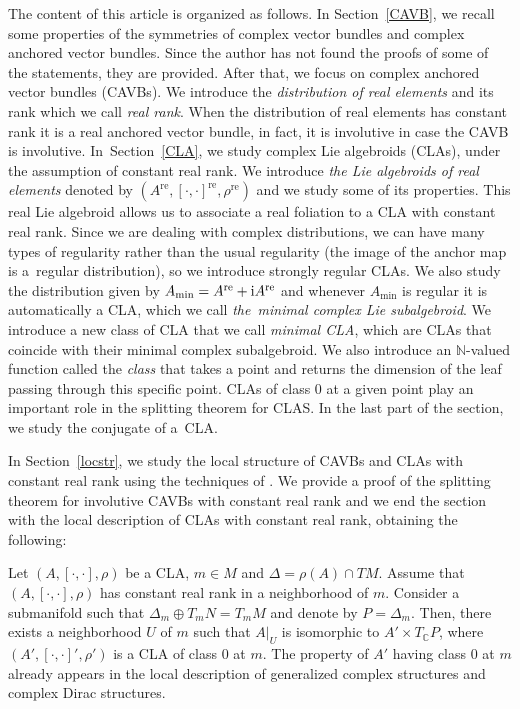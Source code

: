 \documentclass[pdftex]{sigma}
\numberwithin{equation}{section}
\newenvironment{customthm}[1]
{\renewcommand\theinnercustomthm{#1}\innercustomthm}
{\endinnercustomthm}
\newcommand{\C}{{\mathbb{C}}}
\DeclareMathOperator{\real}{re}
\begin{document}
The content of this article is organized as follows. In Section~\ref{CAVB}, we recall some properties of the symmetries of complex vector bundles and complex anchored vector bundles. Since the author has not found the proofs of some of the statements, they are provided. After that, we focus on complex anchored vector bundles (CAVBs). We introduce the {\em distribution of real elements} and its rank which we call {\em real rank}. When the distribution of real elements has constant rank it is a real anchored vector bundle, in fact, it is involutive in case the CAVB is involutive. In~Section~\ref{CLA}, we study complex Lie algebroids (CLAs), under the assumption of constant real rank. We introduce {\em the Lie algebroids of real elements} denoted by $(A^{\real},[\cdot,\cdot]^{\real},\rho^{\real})$ and we study some of its properties. This real Lie algebroid allows us to associate a real foliation to a CLA with constant real rank. Since we are dealing with complex distributions, we can have many types of regularity rather than the usual regularity (the image of the anchor map is a~regular distribution), so we introduce strongly regular CLAs. We also study the distribution given by $A_{\min}=A^{\real}+{\rm i}A^{\real}$ and whenever $A_{\min}$ is regular it is automatically a CLA, which we call {\em the~minimal complex Lie subalgebroid}. We introduce a new class of CLA that we call {\em minimal CLA}, which are CLAs that coincide with their minimal complex subalgebroid. We also introduce an $\mathbb{N}$-valued function called the {\em class} that takes a point and returns the dimension of the leaf passing through this specific point. CLAs of class $0$ at a given point play an important role in the splitting theorem for CLAS. In the last part of the section, we study the conjugate of a~CLA.


In Section~\ref{locstr}, we study the local structure of CAVBs and CLAs with constant real rank using the techniques of \cite{bursztyn2019splitting}. We provide a proof of the splitting theorem for involutive CAVBs with constant real rank and we end the section with the local description of CLAs with constant real rank, obtaining the following:
\begin{customthm}{4.7}

  Let $(A,[\cdot,\cdot],\rho)$ be a CLA, $m\in M$ and $\Delta=\rho(A)\cap TM$. Assume that $(A,[\cdot,\cdot],\rho)$ has constant real rank in a neighborhood of $m$. Consider a submanifold  such that $\Delta_{m}\oplus T_m N=T_m M$ and denote by $P=\Delta_{m}$. Then, there exists a neighborhood $U$ of $m$ such that $A|_{U}$ is isomorphic to $ A'\times T_{\C}P$, where $(A',[\cdot,\cdot]',\rho')$ is a CLA of class $0$ at $m$.
\end{customthm}
The property of $A'$ having class $0$ at $m$ already appears in the local description of generalized complex structures and complex Dirac structures.
\end{document}
